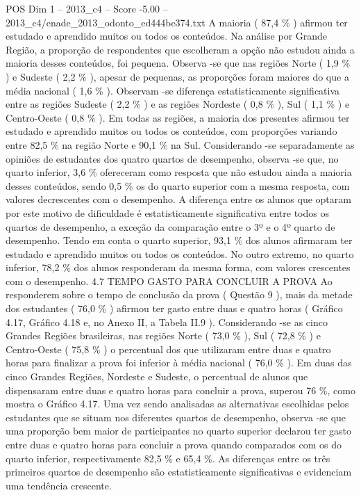 \begin{textsample}{POS Dim 1 – 2013\_c4 – Score -5.00 – 2013\_c4/enade\_2013\_odonto\_ed444be374.txt}
A maioria ( 87,4 \% ) afirmou ter estudado e aprendido muitos ou todos os conteúdos.
Na análise por Grande Região, a proporção de respondentes que escolheram a opção não estudou ainda a maioria desses conteúdos, foi pequena.
Observa -se que nas regiões Norte ( 1,9 \% ) e Sudeste ( 2,2 \% ), apesar de pequenas, as proporções foram maiores do que a média nacional ( 1,6 \% ).
Observam -se diferença estatisticamente significativa entre as regiões Sudeste ( 2,2 \% ) e as regiões Nordeste ( 0,8 \% ), Sul ( 1,1 \% ) e Centro-Oeste ( 0,8 \% ).
Em todas as regiões, a maioria dos presentes afirmou ter estudado e aprendido muitos ou todos os conteúdos, com proporções variando entre 82,5 \% na região Norte e 90,1 \% na Sul.
Considerando -se separadamente as opiniões de estudantes dos quatro quartos de desempenho, observa -se que, no quarto inferior, 3,6 \% ofereceram como resposta que não estudou ainda a maioria desses conteúdos, sendo 0,5 \% os do quarto superior com a mesma resposta, com valores decrescentes com o desempenho.
A diferença entre os alunos que optaram por este motivo de dificuldade é estatisticamente significativa entre todos os quartos de desempenho, a exceção da comparação entre o 3º e o 4º quarto de desempenho.
Tendo em conta o quarto superior, 93,1 \% dos alunos afirmaram ter estudado e aprendido muitos ou todos os conteúdos.
No outro extremo, no quarto inferior, 78,2 \% dos alunos responderam da mesma forma, com valores crescentes com o desempenho. 4.7 TEMPO GASTO PARA CONCLUIR A PROVA Ao responderem sobre o tempo de conclusão da prova ( Questão 9 ), mais da metade dos estudantes ( 76,0 \% ) afirmou ter gasto entre duas e quatro horas ( Gráfico 4.17, Gráfico 4.18 e, no Anexo II, a Tabela II.9 ).
Considerando -se as cinco Grandes Regiões brasileiras, nas regiões Norte ( 73,0 \% ), Sul ( 72,8 \% ) e Centro-Oeste ( 75,8 \% ) o percentual dos que utilizaram entre duas e quatro horas para finalizar a prova foi inferior à média nacional ( 76,0 \% ).
Em duas das cinco Grandes Regiões, Nordeste e Sudeste, o percentual de alunos que dispensaram entre duas e quatro horas para concluir a prova, superou 76 \%, como mostra o Gráfico 4.17.
Uma vez sendo analisadas as alternativas escolhidas pelos estudantes que se situam nos diferentes quartos de desempenho, observa -se que uma proporção bem maior de participantes no quarto superior declarou ter gasto entre duas e quatro horas para concluir a prova quando comparados com os do quarto inferior, respectivamente 82,5 \% e 65,4 \%.
As diferenças entre os três primeiros quartos de desempenho são estatisticamente significativas e evidenciam uma tendência crescente.

\end{textsample}
